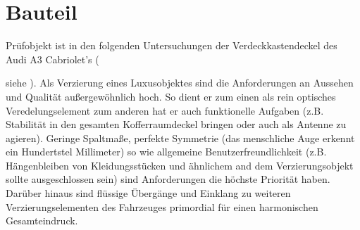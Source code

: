 \documentclass[12pt,a4paper,parskip]{scrartcl}
\begin{document}
\newpage

\section{Bauteil}
Prüfobjekt ist in den folgenden Untersuchungen der Verdeckkastendeckel  des Audi A3 Cabriolet's ({siehe ).
 Als Verzierung eines Luxusobjektes sind die Anforderungen an Aussehen und Qualität außergewöhnlich hoch. So dient er zum einen als rein optisches Veredelungselement zum anderen hat er auch funktionelle Aufgaben (z.B. Stabilität in den gesamten Kofferraumdeckel bringen oder auch als Antenne zu agieren). Geringe Spaltmaße,  perfekte Symmetrie (das menschliche Auge erkennt ein Hundertstel Millimeter) so wie allgemeine Benutzerfreundlichkeit (z.B. Hängenbleiben von Kleidungsstücken und ähnlichem and dem Verzierungsobjekt sollte ausgeschlossen sein) sind Anforderungen die höchste Priorität haben.
 Darüber hinaus sind  flüssige Übergänge und Einklang   zu weiteren Verzierungselementen des Fahrzeuges primordial für einen harmonischen Gesamteindruck.
 
}
\end{document}
